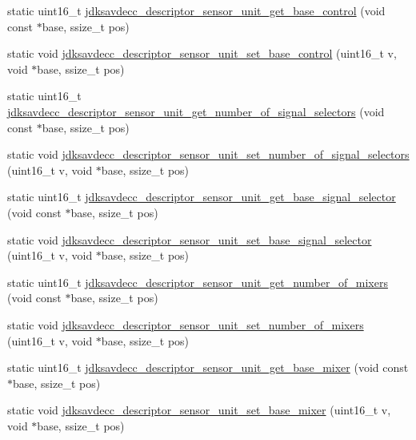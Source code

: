 \begin{DoxyCompactItemize}
\item 
static uint16\+\_\+t \hyperlink{group__descriptor__sensor_gae6f8a9ca5baa42adfcde9de0d63228a1}{jdksavdecc\+\_\+descriptor\+\_\+sensor\+\_\+unit\+\_\+get\+\_\+base\+\_\+control} (void const $\ast$base, ssize\+\_\+t pos)
\item 
static void \hyperlink{group__descriptor__sensor_ga183a282a0632836e47ff56d5c7ce131e}{jdksavdecc\+\_\+descriptor\+\_\+sensor\+\_\+unit\+\_\+set\+\_\+base\+\_\+control} (uint16\+\_\+t v, void $\ast$base, ssize\+\_\+t pos)
\item 
static uint16\+\_\+t \hyperlink{group__descriptor__sensor_gac556159c7ca6b95e4d39eb26f2bcc2e1}{jdksavdecc\+\_\+descriptor\+\_\+sensor\+\_\+unit\+\_\+get\+\_\+number\+\_\+of\+\_\+signal\+\_\+selectors} (void const $\ast$base, ssize\+\_\+t pos)
\item 
static void \hyperlink{group__descriptor__sensor_ga2e7f35ccf1d91730cc95a889610285dd}{jdksavdecc\+\_\+descriptor\+\_\+sensor\+\_\+unit\+\_\+set\+\_\+number\+\_\+of\+\_\+signal\+\_\+selectors} (uint16\+\_\+t v, void $\ast$base, ssize\+\_\+t pos)
\item 
static uint16\+\_\+t \hyperlink{group__descriptor__sensor_ga6cceb73a85c154792b0a8d78aa4eb66e}{jdksavdecc\+\_\+descriptor\+\_\+sensor\+\_\+unit\+\_\+get\+\_\+base\+\_\+signal\+\_\+selector} (void const $\ast$base, ssize\+\_\+t pos)
\item 
static void \hyperlink{group__descriptor__sensor_ga54e4ff061b40ed84e483ff3c6a819520}{jdksavdecc\+\_\+descriptor\+\_\+sensor\+\_\+unit\+\_\+set\+\_\+base\+\_\+signal\+\_\+selector} (uint16\+\_\+t v, void $\ast$base, ssize\+\_\+t pos)
\item 
static uint16\+\_\+t \hyperlink{group__descriptor__sensor_ga58b4b394661e78d2ac5597c8d438c6b1}{jdksavdecc\+\_\+descriptor\+\_\+sensor\+\_\+unit\+\_\+get\+\_\+number\+\_\+of\+\_\+mixers} (void const $\ast$base, ssize\+\_\+t pos)
\item 
static void \hyperlink{group__descriptor__sensor_ga18510efbd3546271101aac8aea7a4680}{jdksavdecc\+\_\+descriptor\+\_\+sensor\+\_\+unit\+\_\+set\+\_\+number\+\_\+of\+\_\+mixers} (uint16\+\_\+t v, void $\ast$base, ssize\+\_\+t pos)
\item 
static uint16\+\_\+t \hyperlink{group__descriptor__sensor_ga6b4b55c548efa8d788053be0ee556ae2}{jdksavdecc\+\_\+descriptor\+\_\+sensor\+\_\+unit\+\_\+get\+\_\+base\+\_\+mixer} (void const $\ast$base, ssize\+\_\+t pos)
\item 
static void \hyperlink{group__descriptor__sensor_gacfb5a61e84ae4ea32029d71457091c72}{jdksavdecc\+\_\+descriptor\+\_\+sensor\+\_\+unit\+\_\+set\+\_\+base\+\_\+mixer} (uint16\+\_\+t v, void $\ast$base, ssize\+\_\+t pos)

\end{DoxyCompactItemize}
